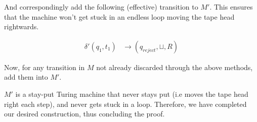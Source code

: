 \documentclass{article}
\begin{document}
And correspondingly add the following (effective) transition to $M'$. This ensures that the machine won't get stuck in an endless loop moving the tape head rightwards.

\begin{align*}
    \delta'(q_1, t_1) & \rightarrow (q_{reject}, \sqcup, R)
\end{align*}

Now, for any transition in $M$ not already discarded through the above methods, add them into $M'$.

$M'$ is a stay-put Turing machine that never stays put (i.e moves the tape head right each step), and never gets stuck in a loop. Therefore, we have completed our desired construction, thus concluding the proof.
\end{document}
